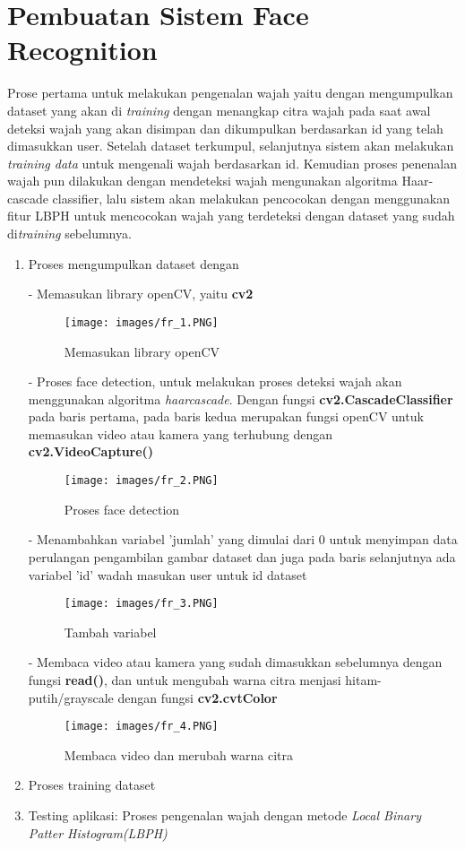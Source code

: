 \newpage
\section{Pembuatan Sistem Face Recognition}
Prose pertama untuk melakukan pengenalan wajah yaitu dengan mengumpulkan dataset yang akan di \emph{training} dengan menangkap citra wajah pada saat awal deteksi wajah yang akan 
disimpan dan dikumpulkan berdasarkan id yang telah dimasukkan user. Setelah dataset terkumpul, selanjutnya sistem akan melakukan \emph{training data} untuk mengenali wajah berdasarkan id. 
Kemudian proses penenalan wajah pun dilakukan dengan mendeteksi wajah mengunakan algoritma Haar-cascade classifier, lalu sistem akan melakukan pencocokan dengan menggunakan fitur LBPH 
untuk mencocokan wajah yang terdeteksi dengan dataset yang sudah di\emph{training} sebelumnya.
\begin{enumerate}[1.]
\item Proses mengumpulkan dataset dengan

- Memasukan library openCV, yaitu \textbf{cv2}
\begin{figure}[h!]
    \centering
    \texttt{[image: images/fr\_1.PNG]}
    \caption{Memasukan library openCV}
\end{figure}

-  Proses face detection, untuk melakukan proses deteksi wajah akan menggunakan algoritma \emph{haarcascade}. Dengan fungsi \textbf{cv2.CascadeClassifier} pada baris pertama, 
pada baris kedua merupakan fungsi openCV untuk memasukan video atau kamera yang terhubung dengan \textbf{cv2.VideoCapture()}
\begin{figure}[h!]
    \centering
    \texttt{[image: images/fr\_2.PNG]}
    \caption{Proses face detection}
\end{figure}

- Menambahkan variabel 'jumlah' yang dimulai dari 0 untuk menyimpan data perulangan pengambilan gambar dataset
dan juga pada baris selanjutnya ada variabel 'id' wadah masukan user untuk id dataset
\begin{figure}[h!]
    \centering
    \texttt{[image: images/fr\_3.PNG]}
    \caption{Tambah variabel}
\end{figure}
\newpage
- Membaca video atau kamera yang sudah dimasukkan sebelumnya dengan fungsi \textbf{read()}, dan untuk mengubah warna citra menjasi hitam-putih/grayscale
dengan fungsi \textbf{cv2.cvtColor}
\begin{figure}[h!]
    \centering
    \texttt{[image: images/fr\_4.PNG]}
    \caption{Membaca video dan merubah warna citra}
\end{figure}

\item Proses training dataset
\item Testing aplikasi: Proses pengenalan wajah dengan metode \emph{Local Binary Patter Histogram(LBPH)}
\end{enumerate}
